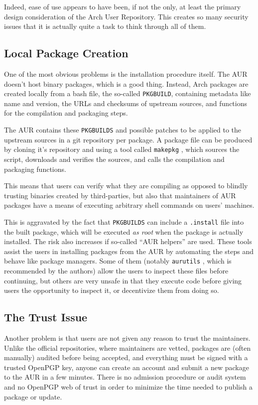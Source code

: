 Indeed, ease of use appears to have been, if not the only, at least the primary design consideration of the Arch User Repository. This creates so many security issues that it is actually quite a task to think through all of them.

\subsection*{Local Package Creation}
One of the most obvious problems is the installation procedure itself.
The AUR doesn't host binary packages, which is a good thing. Instead, Arch packages are created locally from a bash file, the so-called \texttt{PKGBUILD}, containing metadata like name and version, the URLs and checksums of upstream sources, and functions for the compilation and packaging steps. %

The AUR contains these \texttt{PKGBUILDS} and possible patches to be applied to the upstream sources in a git repository per package.
A package file can be produced by cloning it's repository and using a tool called \texttt{makepkg} \cite{wiki:PackageCreation}, which sources the script, downloads and verifies the sources, and calls the compilation and packaging functions.

This means that users can verify what they are compiling as opposed to blindly trusting binaries created by third-parties, but also that maintainers of AUR packages have a means of executing arbitrary shell commands on users' machines.

This is aggravated by the fact that \texttt{PKGBUILDS} can include a \texttt{.install} file into the built package, which will be executed \emph{as root} when the package is actually installed.
The risk also increases if so-called \enquote{AUR helpers} are used. These tools assist the users in installing packages from the AUR by automating the steps and behave like package managers.
Some of them (notably \texttt{aurutils} \cite{gh:aurutils}, which is recommended by the authors) allow the users to inspect these files before continuing, but others are very unsafe in that they execute code before giving users the opportunity to inspect it, or decentivize them from doing so.

\subsection*{The Trust Issue}
Another problem is that users are not given any reason to trust the maintainers.
Unlike the official repositories, where maintainers are vetted, packages are (often manually) audited before being accepted, and everything must be signed with a trusted OpenPGP key, anyone can create an account and submit a new package to the AUR in a few minutes.
There is no admission procedure or audit system and no OpenPGP web of trust in order to minimize the time needed to publish a package or update.

